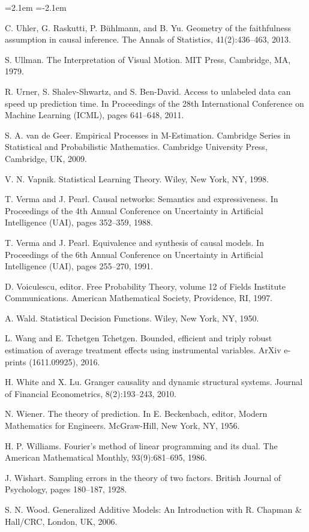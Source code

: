 \begin{list}{}{\leftmargin=2.1em
 \itemindent=-2.1em\parsep=0pt\itemsep=3pt}
\item C. Uhler, G. Raskutti, P. Bühlmann, and B. Yu. Geometry of the faithfulness assumption in causal inference. The Annals of Statistics, 41(2):436--463, 2013.
\item S. Ullman. The Interpretation of Visual Motion. MIT Press, Cambridge, MA, 1979.
\item R. Urner, S. Shalev-Shwartz, and S. Ben-David. Access to unlabeled data can speed up prediction time. In Proceedings of the 28th International Conference on Machine Learning (ICML), pages 641--648, 2011.
\item S. A. van de Geer. Empirical Processes in M-Estimation. Cambridge Series in Statistical and Probabilistic Mathematics. Cambridge University Press, Cambridge, UK, 2009.
\item V. N. Vapnik. Statistical Learning Theory. Wiley, New York, NY, 1998.
\item T. Verma and J. Pearl. Causal networks: Semantics and expressiveness. In Proceedings of the 4th Annual Conference on Uncertainty in Artificial Intelligence (UAI), pages 352--359, 1988.
\item T. Verma and J. Pearl. Equivalence and synthesis of causal models. In Proceedings of the 6th Annual Conference on Uncertainty in Artificial Intelligence (UAI), pages 255--270, 1991.
\item D. Voiculescu, editor. Free Probability Theory, volume 12 of Fields Institute Communications. American Mathematical Society, Providence, RI, 1997.
\item A. Wald. Statistical Decision Functions. Wiley, New York, NY, 1950.
\item L. Wang and E. Tchetgen Tchetgen. Bounded, efficient and triply robust estimation of average treatment effects using instrumental variables. ArXiv e-prints (1611.09925), 2016.
\item H. White and X. Lu. Granger causality and dynamic structural systems. Journal of Financial Econometrics, 8(2):193--243, 2010.
\item N. Wiener. The theory of prediction. In E. Beckenbach, editor, Modern Mathematics for Engineers. McGraw-Hill, New York, NY, 1956.
\item H. P. Williams. Fourier's method of linear programming and its dual. The American Mathematical Monthly, 93(9):681--695, 1986.
\item J. Wishart. Sampling errors in the theory of two factors. British Journal of Psychology, pages 180--187, 1928.
\item S. N. Wood. Generalized Additive Models: An Introduction with R. Chapman \& Hall/CRC, London, UK, 2006.

\end{list}
